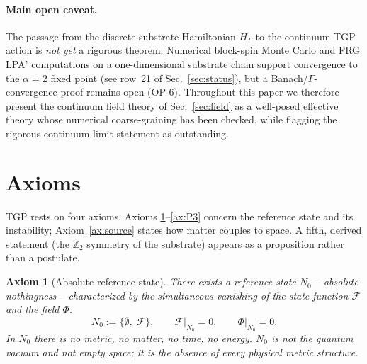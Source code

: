 \documentclass[11pt,a4paper]{article}
\renewcommand{\Phi}{\varPhi}
\newcommand{\Nzero}{N_{0}}
\newcommand{\Ffield}{\mathcal{F}}
\newcommand{\Zp}{\mathbb{Z}_{2}}
\newtheorem{axiom}{Axiom}
\begin{document}
\paragraph{Main open caveat.} The passage from the discrete substrate
Hamiltonian $H_{\Gamma}$ to the continuum TGP action is \emph{not yet}
a rigorous theorem. Numerical block-spin Monte Carlo and FRG LPA'
computations on a one-dimensional substrate chain support convergence
to the $\alpha=2$ fixed point (see row~21 of
Sec.~\ref{sec:status}), but a Banach/$\Gamma$-convergence proof remains
open (OP-6). Throughout this paper we therefore present the continuum
field theory of Sec.~\ref{sec:field} as a well-posed effective theory
whose numerical coarse-graining has been checked, while flagging the
rigorous continuum-limit statement as outstanding.

\section{Axioms}\label{sec:axioms}

TGP rests on four axioms. Axioms \ref{ax:N0}--\ref{ax:P3} concern the
reference state and its instability; Axiom~\ref{ax:source} states how
matter couples to space. A fifth, derived statement (the $\Zp$ symmetry
of the substrate) appears as a proposition rather than a postulate.

\begin{axiom}[Absolute reference state]\label{ax:N0}
There exists a reference state $\Nzero$ -- \emph{absolute nothingness} --
characterized by the simultaneous vanishing of the state function
$\Ffield$ and the field $\Phi$:
\begin{equation}\label{eq:N0}
  \Nzero := \bigl\{\emptyset,\;\Ffield\bigr\},
  \qquad
  \Ffield\big|_{\Nzero}=0,
  \qquad
  \Phi\big|_{\Nzero}=0.
\end{equation}
In $\Nzero$ there is no metric, no matter, no time, no energy.
$\Nzero$ is \emph{not} the quantum vacuum and \emph{not} empty space;
it is the absence of every physical metric structure.
\end{axiom}
\end{document}
